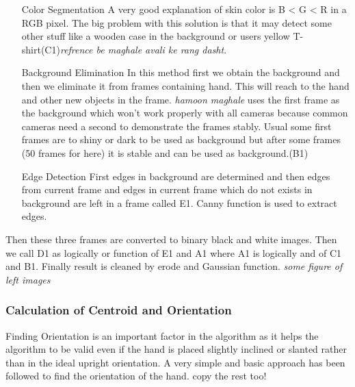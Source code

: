 \documentclass{report}
\begin{document}
\begin{enumerate}
	\item[Color Segmentation]{A very good explanation of skin color is B < G < R in a RGB pixel. The big problem with this solution is that it may detect some other stuff like a wooden case in the background or users yellow T-shirt(C1)\textit{refrence be maghale avali ke rang dasht}.}
	\item[Background Elimination]{In this method first we obtain the background and then we eliminate it from frames containing hand. This will reach to the hand and other new objects in the frame. \textit{hamoon maghale} uses the first frame as the background which won't work properly with all cameras because common cameras need a second to demonstrate the frames stably. Usual some first frames are to shiny or dark to be used as background but after some frames (50 frames for here) it is stable and can be used as background.(B1)} %
	\item[Edge Detection] {First edges in background are determined and then edges from current frame and edges in current frame which do not exists in background are left in a frame called E1. Canny function is used to extract edges.}
\end{enumerate}
Then these three frames are converted to binary black and white images. Then we call D1 as logically or function of E1 and A1 where A1 is logically and of C1 and B1. Finally result is cleaned by erode and Gaussian function. 
\textit{some figure of left images}


\subsubsection{Calculation of Centroid and Orientation}
Finding Orientation is an important factor in the algorithm as it helps the algorithm to be valid
even if the hand is placed slightly inclined or slanted rather than in the ideal upright orientation. A
very simple and basic approach has been followed to find the orientation of the hand.
copy the rest too!
\end{document}
